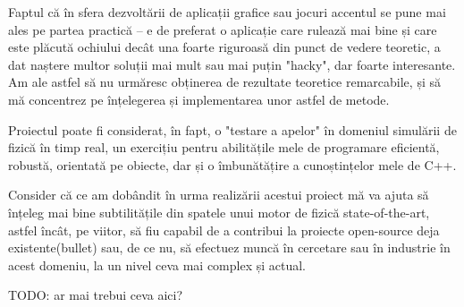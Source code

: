\documentclass[12pt,a4paper]{report}
\newcommand{\worktype}[1]{[\textit{#1}] }
\newcommand{\dezvoltare}{\worktype{Dezvoltare de produs}}
\newcommand{\cercetare}{\worktype{Cercetare}}
\begin{document}
Faptul că în sfera dezvoltării de aplicații grafice sau jocuri accentul se pune mai ales pe partea practică -- e de preferat o aplicație care rulează mai bine și care este plăcută ochiului decât una foarte riguroasă din punct de vedere teoretic, a dat naștere multor soluții mai mult sau mai puțin "hacky", dar foarte interesante. Am ale astfel să nu urmăresc obținerea de rezultate teoretice remarcabile, și să mă concentrez pe înțelegerea și implementarea unor astfel de metode.

Proiectul poate fi considerat, în fapt, o "testare a apelor" în domeniul simulării de fizică în timp real, un exercițiu pentru abilitățile mele de programare eficientă, robustă, orientată pe obiecte, dar și o îmbunătățire a cunoștințelor mele de C++.

Consider că ce am dobândit în urma realizării acestui proiect mă va ajuta să înțeleg mai bine subtilitățile din spatele unui motor de fizică state-of-the-art, astfel încât, pe viitor, să fiu capabil de a contribui la proiecte open-source deja existente(bullet\cite{bullet}) sau, de ce nu, să efectuez muncă în cercetare sau în industrie în acest domeniu, la un nivel ceva mai complex și actual.

TODO: ar mai trebui ceva aici?


%
%
%
%
%
%
\end{document}
